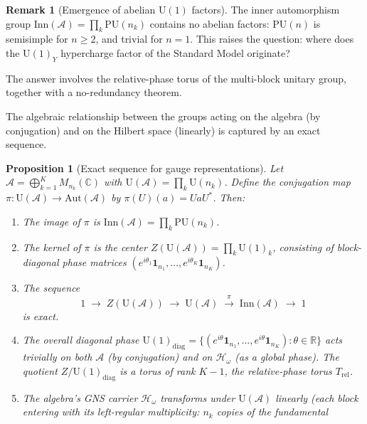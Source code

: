 \documentclass[11pt]{article}
\newtheorem{proposition}[theorem]{Proposition}
\theoremstyle{definition}
\newtheorem{remark}[theorem]{Remark}
\newcommand{\U}{\mathrm{U}}
\begin{document}
\begin{remark}[Emergence of abelian $\U(1)$ factors]\label{rem:U1}
The inner automorphism group $\mathrm{Inn}(\mathcal{A}) = \prod_k
\mathrm{PU}(n_k)$ contains no abelian factors: $\mathrm{PU}(n)$ is
semisimple for $n \ge 2$, and trivial for $n = 1$.  This raises the
question: where does the $\U(1)_Y$ hypercharge factor of the Standard
Model originate?

The answer involves the relative-phase torus of the multi-block unitary
group, together with a no-redundancy theorem.
\end{remark}

The algebraic relationship between the groups acting on the algebra
(by conjugation) and on the Hilbert space (linearly) is captured by
an exact sequence.

\begin{proposition}[Exact sequence for gauge representations]%
\label{prop:exact_seq}
Let $\mathcal{A} = \bigoplus_{k=1}^K M_{n_k}(\mathbb{C})$ with
$\mathrm{U}(\mathcal{A}) = \prod_k \mathrm{U}(n_k)$.  Define
the conjugation map $\pi: \mathrm{U}(\mathcal{A}) \to
\mathrm{Aut}(\mathcal{A})$ by $\pi(U)(a) = UaU^*$.  Then:
\begin{enumerate}[label=(\roman*),nosep]
  \item The image of $\pi$ is $\mathrm{Inn}(\mathcal{A}) = \prod_k
  \mathrm{PU}(n_k)$.
  \item The kernel of $\pi$ is the center
  $Z(\mathrm{U}(\mathcal{A})) = \prod_k \mathrm{U}(1)_k$,
  consisting of block-diagonal phase matrices
  $(e^{i\theta_1}\mathbf{1}_{n_1}, \ldots,
  e^{i\theta_K}\mathbf{1}_{n_K})$.
  \item The sequence
  \[
    1 \;\longrightarrow\; Z(\mathrm{U}(\mathcal{A}))
    \;\longrightarrow\; \mathrm{U}(\mathcal{A})
    \;\xrightarrow{\;\pi\;}\;
    \mathrm{Inn}(\mathcal{A}) \;\longrightarrow\; 1
  \]
  is exact.
  \item The overall diagonal phase
  $\mathrm{U}(1)_{\mathrm{diag}} = \{(e^{i\theta}\mathbf{1}_{n_1},
  \ldots, e^{i\theta}\mathbf{1}_{n_K}) : \theta \in \mathbb{R}\}$
  acts trivially on both $\mathcal{A}$ (by conjugation) and on
  $\mathcal{H}_\omega$ (as a global phase).  The quotient
  $Z / \mathrm{U}(1)_{\mathrm{diag}}$ is a torus of rank $K - 1$, the
  relative-phase torus $T_{\mathrm{rel}}$.
  \item The algebra's GNS carrier $\mathcal{H}_\omega$ transforms
  under $\mathrm{U}(\mathcal{A})$ linearly (each block entering with
  its left-regular multiplicity: $n_k$ copies of the fundamental

\end{enumerate}
\end{proposition}
\end{document}
